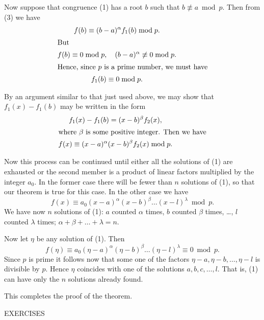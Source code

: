 \documentclass[oneside]{book}
\begin{document}
Now suppose that congruence (1) has a root $b$ such that
$b\not\equiv a \bmod p$. Then from (3) we have
\begin{gather*}
f(b) \equiv (b-a)^{\alpha}f_1(b) \bmod p. \\
\intertext{But}
f(b)\equiv 0 \bmod p,\quad (b-a)^{\alpha} \not\equiv 0 \bmod p. \\
\intertext{Hence, since $p$ is a prime number, we must have}
f_1(b)\equiv 0 \bmod p.
\end{gather*}

By an argument similar to that just used above, we may show that
$f_1(x) - f_1(b)$ may be written in the form
\begin{gather*}
f_1(x) - f_1(b) = (x-b)^{\beta}f_2(x), \\
\intertext{where $\beta$ is some positive integer. Then we have}
f(x) \equiv (x-a)^{\alpha}(x-b)^{\beta}f_2(x) \bmod p.
\end{gather*}

Now this process can be continued until either all the solutions of
(1) are exhausted or the second member is a product of linear
factors multiplied by the integer $a_0$. In the former case there
will be fewer than $n$ solutions of (1), so that our theorem is true
for this case. In the other case we have
\begin{equation*}
f(x) \equiv a_0(x-a)^{\alpha}(x-b)^{\beta}
     \ldots (x-l)^{\lambda} \bmod p.
\end{equation*}
We have now $n$ solutions of (1): $a$ counted $\alpha$ times, $b$
counted $\beta$ times, \ldots, $l$ counted $\lambda$ times; $\alpha
+ \beta + \ldots +\lambda = n$.

Now let $\eta$ be any solution of (1). Then
\begin{equation*}
f(\eta) \equiv a_0(\eta-a)^{\alpha}(\eta-b)^{\beta} \ldots
   (\eta-l)^{\lambda} \equiv 0 \bmod p.
\end{equation*}
Since $p$ is prime it follows now that some one of the factors
$\eta-a, \eta-b, \ldots, \eta-l$ is divisible by $p$. Hence $\eta$
coincides with one of the solutions $a, b, c, \ldots, l$. That is,
(1) can have only the $n$ solutions already found.

This completes the proof of the theorem.

\begin{center}
EXERCISES
\end{center}
\end{document}
